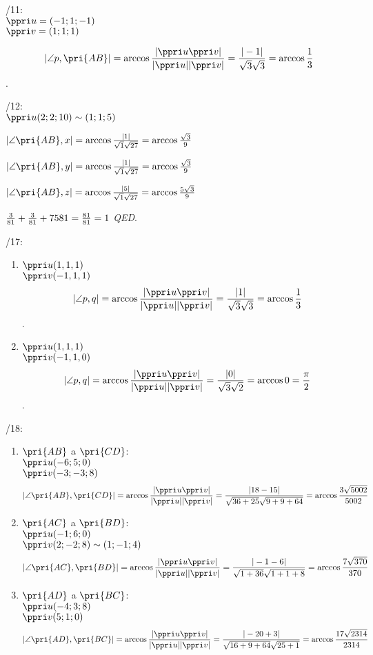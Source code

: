 /11:\\
$\ve u = (-1;1;-1)$\\
$\ve v = (1;1;1)$

$$ |\angle p,\pri{AB}|=\arccos\f{|\ve u \* \ve v|}{|\ve u|\*|\ve v|} = \f{|-1|}{\sqrt 3 \* \sqrt 3} = \arccos \f{1}3$$.

/12:\\
$\ve u (2;2;10) \sim (1;1;5)$

$|\angle \pri{AB},x| = \arccos \f{|1|}{\sqrt{1}\*\sqrt{27}} = \arccos \f{\sqrt3}9$

$|\angle \pri{AB},y| = \arccos \f{|1|}{\sqrt{1}\*\sqrt{27}} = \arccos \f{\sqrt3}9$

$|\angle \pri{AB},z| = \arccos \f{|5|}{\sqrt{1}\*\sqrt{27}} = \arccos \f{5\sqrt3}9$

$\frac{3}{81}+\frac3{81}+{75}{81} = \frac{81}{81} = 1$ \emph{QED}.

/17:
\begin{enumerate}
	\item $\ve u (1,1,1)$\\
		$\ve v (-1,1,1)$
$$ |\angle p,q|=\arccos\f{|\ve u \* \ve v|}{|\ve u|\*|\ve v|} = \f{|1|}{\sqrt 3 \* \sqrt 3} = \arccos \f{1}3$$.
	\item $\ve u (1,1,1)$\\
		$\ve v (-1,1,0)$
$$ |\angle p,q|=\arccos\f{|\ve u \* \ve v|}{|\ve u|\*|\ve v|} = \f{|0|}{\sqrt 3 \* \sqrt 2} = \arccos 0 = \f\pi2$$.
\end{enumerate}

/18:
\begin{enumerate}
	\item $\pri {AB}$ a $\pri{CD}$:\\
		$\ve u (-6;5;0)$\\
		$\ve v (-3;-3;8)$\\
		$$ |\angle \pri{AB},\pri{CD}|=\arccos\f{|\ve u \* \ve v|}{|\ve u|\*|\ve v|} = \f{|18-15|}{\sqrt {36+25} \* \sqrt {9+9+64}} = \arccos \f{3\sqrt{5002}}{5002}$$

	\item $\pri {AC}$ a $\pri{BD}$:\\
		$\ve u (-1;6;0)$\\
		$\ve v (2;-2;8)\sim(1;-1;4)$\\
		$$ |\angle \pri{AC},\pri{BD}|=\arccos\f{|\ve u \* \ve v|}{|\ve u|\*|\ve v|} = \f{|-1-6|}{\sqrt {1+36} \* \sqrt {1+1+8}} = \arccos \f{7\sqrt{370}}{370}$$

	\item $\pri {AD}$ a $\pri{BC}$:\\
		$\ve u (-4;3;8)$\\
		$\ve v (5;1;0)$\\
		$$ |\angle \pri{AD},\pri{BC}|=\arccos\f{|\ve u \* \ve v|}{|\ve u|\*|\ve v|} = \f{|-20+3|}{\sqrt {16+9+64} \* \sqrt {25+1}} = \arccos \f{17\*\sqrt{2314}}{2314}$$
\end{enumerate}

